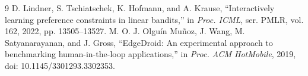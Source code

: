 \documentclass[11pt,a4paper]{article}
\begin{document}
\begin{thebibliography}{9}
D. Lindner, S. Tschiatschek, K. Hofmann, and A. Krause, ``Interactively learning preference constraints in linear bandits,'' in \emph{Proc. ICML}, ser. PMLR, vol. 162, 2022, pp. 13505--13527.
M. O. J. Olgu\'{i}n Mu\~noz, J. Wang, M. Satyanarayanan, and J. Gross, ``EdgeDroid: An experimental approach to benchmarking human-in-the-loop applications,'' in \emph{Proc. ACM HotMobile}, 2019, doi: 10.1145/3301293.3302353.
\end{thebibliography}
\end{document}
